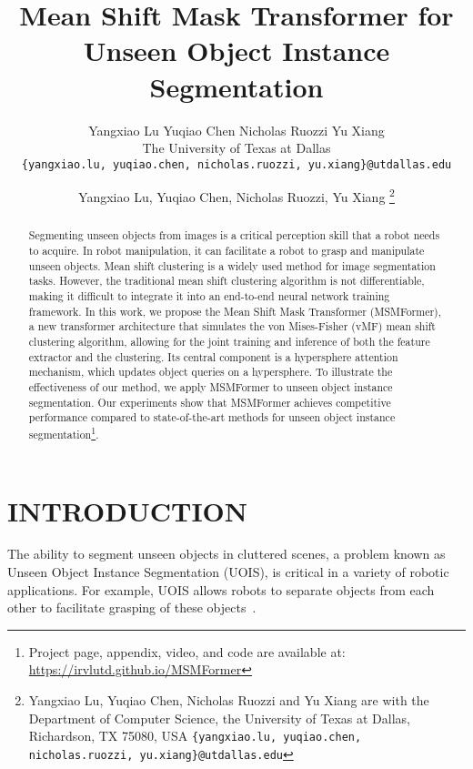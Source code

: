 \documentclass[letterpaper, 10 pt, conference]{ieeeconf}
\title{\LARGE \bf
Mean Shift Mask Transformer for Unseen Object Instance Segmentation
}
\author{Yangxiao Lu \hspace{3px} Yuqiao Chen \hspace{3px} Nicholas Ruozzi \hspace{3px} Yu Xiang\\
The University of Texas at Dallas \hspace{3px} \\
{\tt\small \{yangxiao.lu, yuqiao.chen, nicholas.ruozzi, yu.xiang\}@utdallas.edu}
}
\author{
Yangxiao Lu, Yuqiao Chen, Nicholas Ruozzi, Yu Xiang
\thanks{Yangxiao Lu, Yuqiao Chen, Nicholas Ruozzi and Yu Xiang are with the Department of Computer Science, the University of Texas at Dallas, Richardson, TX 75080, USA \tt\small \{yangxiao.lu, yuqiao.chen, nicholas.ruozzi, yu.xiang\}@utdallas.edu}}
\begin{document}
\maketitle
\thispagestyle{empty}
\pagestyle{empty}



\begin{abstract}
Segmenting unseen objects from images is a critical perception skill that a robot needs to acquire. In robot manipulation, it can facilitate a robot to grasp and manipulate unseen objects. Mean shift clustering is a widely used method for image segmentation tasks. However, the traditional mean shift clustering algorithm is not differentiable, making it difficult to integrate it into an end-to-end neural network training framework. In this work, we propose the Mean Shift Mask Transformer (MSMFormer), a new transformer architecture that simulates the von Mises-Fisher (vMF) mean shift clustering algorithm, allowing for the joint training and inference of both the feature extractor and the clustering. Its central component is a hypersphere attention mechanism, which updates object queries on a hypersphere. To illustrate the effectiveness of our method, we apply MSMFormer to unseen object instance segmentation. Our experiments show that MSMFormer achieves competitive performance compared to state-of-the-art methods for unseen object instance segmentation\footnote{Project page, appendix, video, and code are available at: \url{https://irvlutd.github.io/MSMFormer}}.

\end{abstract}


\vspace{-2mm}
\section{INTRODUCTION}
\vspace{-2mm}

The ability to segment unseen objects in cluttered scenes, a problem known as Unseen Object Instance Segmentation (UOIS), is critical in a variety of robotic applications. For example, UOIS allows robots to separate objects from each other to facilitate grasping of these objects~\cite{mousavian20196,sundermeyer2021contact,wang2022goal,goyal2022ifor}.
\end{document}
